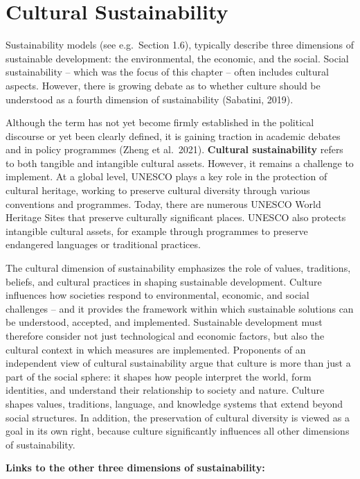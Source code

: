 \documentclass[
  a4paper,
  openany]{book}
\begin{document}
\section{Cultural Sustainability}\label{cultural-sustainability}

Sustainability models (see e.g.~Section 1.6), typically describe three
dimensions of sustainable development: the environmental, the economic,
and the social. Social sustainability -- which was the focus of this
chapter -- often includes cultural aspects. However, there is growing
debate as to whether culture should be understood as a fourth dimension
of sustainability (Sabatini, 2019).

Although the term has not yet become firmly established in the political
discourse or yet been clearly defined, it is gaining traction in
academic debates and in policy programmes (Zheng et al.~2021).
\textbf{Cultural sustainability} refers to both tangible and intangible
cultural assets. However, it remains a challenge to implement. At a
global level, UNESCO plays a key role in the protection of cultural
heritage, working to preserve cultural diversity through various
conventions and programmes. Today, there are numerous UNESCO World
Heritage Sites that preserve culturally significant places. UNESCO also
protects intangible cultural assets, for example through programmes to
preserve endangered languages or traditional practices.

The cultural dimension of sustainability emphasizes the role of values,
traditions, beliefs, and cultural practices in shaping sustainable
development. Culture influences how societies respond to environmental,
economic, and social challenges -- and it provides the framework within
which sustainable solutions can be understood, accepted, and
implemented. Sustainable development must therefore consider not just
technological and economic factors, but also the cultural context in
which measures are implemented. Proponents of an independent view of
cultural sustainability argue that culture is more than just a part of
the social sphere: it shapes how people interpret the world, form
identities, and understand their relationship to society and nature.
Culture shapes values, traditions, language, and knowledge systems that
extend beyond social structures. In addition, the preservation of
cultural diversity is viewed as a goal in its own right, because culture
significantly influences all other dimensions of sustainability.

\textbf{Links to the other three dimensions of sustainability:}
\end{document}

